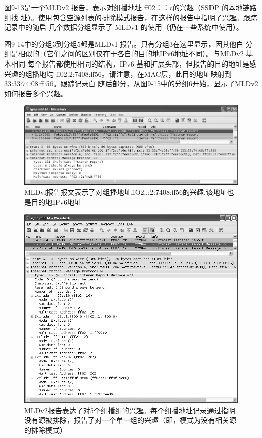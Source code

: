 图9-13是一个MLDv2 报告，表示对组播地址 ff02：：c的兴趣（SSDP 的本地链路组找
址）。使用包含空源列表的排除模式报告，在这样的报告中指明了兴趣。跟踪记录中的随启
几个数据分组显示了 MLDv1 的使用（仍在一些系统中使用）。

图9-14中的分组3到分组5都是MLDvI 报告。只有分组3在这里显示，因其他白
分组是相似的（它们之间的区别仅在于各自的目的地IPv6地址不同）。与MLDv2 基本相同
每个报告都使用相同的结构，IPv6 基和扩展头部，但报告的目的地址是感兴趣的组播地均
ff02:2:7408:ff56。请注意，在MAC层，此目的地址映射到 33:33:74:08:ff:56。跟踪记录白
随后部分，从图9-15中的分组6开始，显示了MLDv2如何报告多个兴趣。
\begin{figure}[ht]
    \centering
	\includegraphics[width=1.0\textwidth]{imgs/9/9-14.png}
	\caption{MLDvl报告报文表示了对组播地址ffO2‥:2:7408:ff56的兴趣,该地址也是目的地IPv6地址}
\end{figure}

\begin{figure}[ht]
    \centering
	\includegraphics[width=1.0\textwidth]{imgs/9/9-15.png}
	\caption{MLDv2报告表达了对5个组播组的兴趣。每个组播地址记录通过指明没有源被排除，报告了对一个单一组的兴趣（即，模式为没有相关源的排除模式）}
\end{figure}

